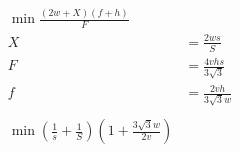 \begin{align*}
	\min{  \frac{(2w + X)(f+h)}{F}  }
	\\
	X &= \frac{2 w s}{ S} \\
	F &= \frac{4 v h s}{3\sqrt{3}} \\
	f &= \frac{2 v h }{3\sqrt{3} w} \\
	\\
	\min{  (\frac{1}{s} + \frac{1}{S}) (1 + \frac{3\sqrt{3} w}{  2 v } )  } \\
\end{align*}
\fi


